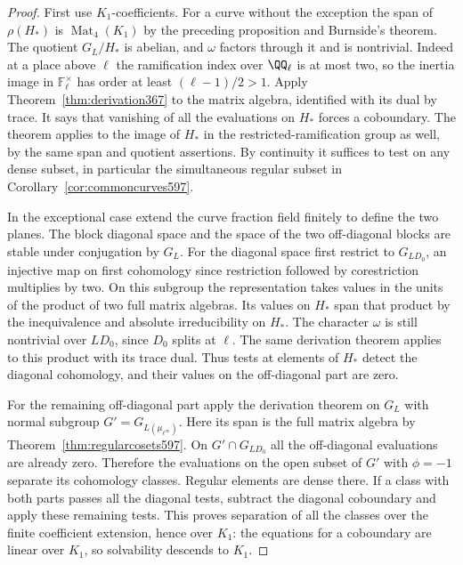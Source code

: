 \documentclass[a4paper,11pt]{article}
\theoremstyle{definition}
\theoremstyle{remark}
\numberwithin{equation}{section}
\begin{document}
\begin{proof}
First use \(K_1\)-coefficients. For a curve without the
exception the span of \(\rho(H_*)\) is
\(\operatorname{Mat}_4(K_1)\) by the preceding proposition
and Burnside's theorem. The quotient \(G_L/H_*\) is abelian,
and \(\omega\) factors through it and is nontrivial.
Indeed at a place above \(\ell\) the ramification index
over \(\QQ_\ell\) is at most two, so the inertia image
in \(\mathbb F_\ell^\times\) has order at least
\((\ell-1)/2>1\). Apply Theorem~\ref{thm:derivation367}
to the matrix algebra, identified with its dual by trace.
It says that vanishing of all the evaluations on \(H_*\)
forces a coboundary. The theorem applies to the image
of \(H_*\) in the restricted-ramification group as well,
by the same span and quotient assertions. By continuity
it suffices to test on any dense subset, in particular
the simultaneous regular subset in
Corollary~\ref{cor:commoncurves597}.

In the exceptional case extend the curve fraction field
finitely to define the two planes. The block diagonal
space and the space of the two off-diagonal blocks are
stable under conjugation by \(G_L\). For the diagonal
space first restrict to \(G_{LD_0}\), an injective map
on first cohomology since restriction followed by
corestriction multiplies by two. On this subgroup the
representation takes values in the units of the product
of two full matrix algebras. Its values on \(H_*\) span
that product by the inequivalence and absolute
irreducibility on \(H_*\). The character \(\omega\)
is still nontrivial over \(LD_0\), since \(D_0\) splits
at \(\ell\). The same derivation theorem applies to
this product with its trace dual. Thus tests at elements
of \(H_*\) detect the diagonal cohomology, and their
values on the off-diagonal part are zero.

For the remaining off-diagonal part apply the derivation
theorem on \(G_L\) with normal subgroup
\(G'=G_{L(\mu_{\ell^\infty})}\). Here its span is the
full matrix algebra by Theorem~\ref{thm:regularcosets597}.
On \(G'\cap G_{LD_0}\) all the off-diagonal evaluations
are already zero. Therefore the evaluations on the open
subset of \(G'\) with \(\phi=-1\) separate its cohomology
classes. Regular elements are dense there. If a class
with both parts passes all the diagonal tests, subtract
the diagonal coboundary and apply these remaining tests.
This proves separation of all the classes over the
finite coefficient extension, hence over \(K_1\):
the equations for a coboundary are linear over \(K_1\),
so solvability descends to \(K_1\).


\end{proof}
\end{document}
